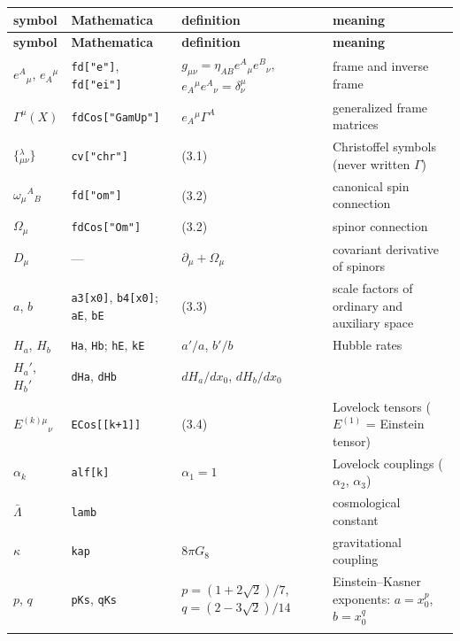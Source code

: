 \documentclass[10pt,a4paper]{article}
\begin{document}
{\small
\begin{longtable}{>{\raggedright\arraybackslash}p{}>{\raggedright\arraybackslash}p{}>{\raggedright\arraybackslash}p{}>{\raggedright\arraybackslash}p{}}
\toprule
\textbf{symbol} & \textbf{Mathematica} & \textbf{definition} & \textbf{meaning} \\
\midrule\endfirsthead
\toprule
\textbf{symbol} & \textbf{Mathematica} & \textbf{definition} & \textbf{meaning} \\
\midrule\endhead
\endfoot
\bottomrule\endlastfoot
$e^A{}_\mu$, $e_A{}^\mu$ & \texttt{fd["e"]}, \texttt{fd["ei"]} & $g_{\mu\nu}=\eta_{AB}e^A{}_\mu e^B{}_\nu$, $e_A{}^\mu e^A{}_\nu=\delta^\mu_\nu$ & frame and inverse frame \\
$\Gamma^\mu(X)$ & \texttt{fdCos["GamUp"]} & $e_A{}^\mu\Gamma^A$ & generalized frame matrices \\
$\{{}^{\lambda}_{\mu\nu}\}$ & \texttt{cv["chr"]} & (3.1) & Christoffel symbols (never written $\Gamma$) \\
$\omega_\mu{}^A{}_B$ & \texttt{fd["om"]} & (3.2) & canonical spin connection \\
$\Omega_\mu$ & \texttt{fdCos["Om"]} & (3.2) & spinor connection \\
$D_\mu$ & — & $\partial_\mu+\Omega_\mu$ & covariant derivative of spinors \\
$a$, $b$ & \texttt{a3[x0]}, \texttt{b4[x0]}; \texttt{aE}, \texttt{bE} & (3.3) & scale factors of ordinary and auxiliary space \\
$H_a$, $H_b$ & \texttt{Ha}, \texttt{Hb}; \texttt{hE}, \texttt{kE} & $a'/a$, $b'/b$ & Hubble rates \\
$H_a'$, $H_b'$ & \texttt{dHa}, \texttt{dHb} & $dH_a/dx_0$, $dH_b/dx_0$ &  \\
$E^{(k)\mu}{}_\nu$ & \texttt{ECos[[k+1]]} & (3.4) & Lovelock tensors ($E^{(1)}$ = Einstein tensor) \\
$\alpha_k$ & \texttt{alf[k]} & $\alpha_1=1$ & Lovelock couplings ($\alpha_2$, $\alpha_3$) \\
$\bar\Lambda$ & \texttt{lamb} &  & cosmological constant \\
$\kappa$ & \texttt{kap} & $8\pi G_8$ & gravitational coupling \\
$p$, $q$ & \texttt{pKs}, \texttt{qKs} & $p=(1+2\sqrt2)/7$, $q=(2-3\sqrt2)/14$ & Einstein–Kasner exponents: $a=x_0^p$, $b=x_0^q$ \\*
\end{longtable}}
\end{document}
